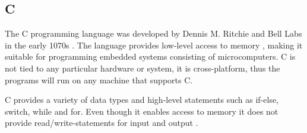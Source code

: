 \subsection{C}
The C programming language was developed by Dennis M. Ritchie and Bell Labs in the early 1070s \cite{clanguage}. The language provides low-level access to memory , making it suitable for programming embedded systems consisting of microcomputers. C is not tied to any particular hardware or system, it is cross-platform, thus the programs will run on any machine that supports C.

C provides a variety of data types and high-level statements such as if-else, switch, while and for. Even though it enables access to memory it does not provide read/write-statements for input and output \cite{cproglang}. 